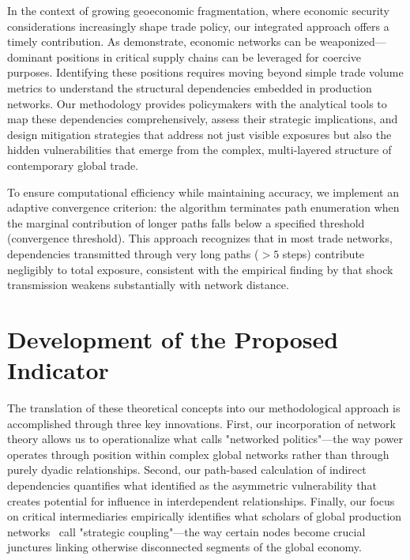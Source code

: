 \documentclass[final,1p,times,authoryear]{elsarticle}
\begin{document}
In the context of growing geoeconomic fragmentation, where economic security considerations increasingly shape trade policy, our integrated approach offers a timely contribution. As \cite{farrell2019weaponized} demonstrate, economic networks can be weaponized—dominant positions in critical supply chains can be leveraged for coercive purposes. Identifying these positions requires moving beyond simple trade volume metrics to understand the structural dependencies embedded in production networks. Our methodology provides policymakers with the analytical tools to map these dependencies comprehensively, assess their strategic implications, and design mitigation strategies that address not just visible exposures but also the hidden vulnerabilities that emerge from the complex, multi-layered structure of contemporary global trade.

To ensure computational efficiency while maintaining accuracy, we implement an adaptive convergence criterion: the algorithm terminates path enumeration when the marginal contribution of longer paths falls below a specified threshold (convergence threshold). This approach recognizes that in most trade networks, dependencies transmitted through very long paths ($>5$ steps) contribute negligibly to total exposure, consistent with the empirical finding by \cite{Costa2022} that shock transmission weakens substantially with network distance.


\section{Development of the Proposed Indicator}

The translation of these theoretical concepts into our methodological approach is accomplished through three key innovations. First, our incorporation of network theory allows us to operationalize what \cite{kahler2009networked} calls "networked politics"—the way power operates through position within complex global networks rather than through purely dyadic relationships. Second, our path-based calculation of indirect dependencies quantifies what \cite{hirschman1945national} identified as the asymmetric vulnerability that creates potential for influence in interdependent relationships. Finally, our focus on critical intermediaries empirically identifies what scholars of global production networks \citep{gereffi2005governance} \ call "strategic coupling"—the way certain nodes become crucial junctures linking otherwise disconnected segments of the global economy.
\end{document}
